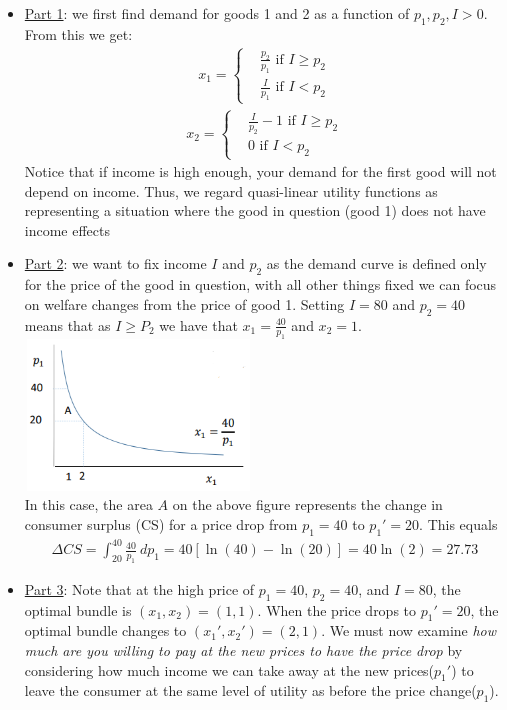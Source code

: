 \documentclass{article}
\begin{document}
  \begin{itemize}
    \item \underline{Part 1}: we first find demand for goods 1 and 2 as a function of $p_{1}, p_{2}, I > 0$. From this we get:
    \begin{gather*}
      x_{1} =
      \begin{cases}
         & \tfrac{p_{2}}{p_{1}} \text{ if } I \geq p_{2} \\
         & \tfrac{I}{p_{1}} \text{ if } I <  p_{2}
      \end{cases}
    \end{gather*}
    \begin{gather*}
      x_{2} =
      \begin{cases}
         & \tfrac{I}{p_{2}} - 1 \text{ if } I \geq p_{2} \\
         & 0 \text{ if } I < p_{2}
       \end{cases}
    \end{gather*}
    Notice that if income is high enough, your demand for the first good will not depend on income. Thus, we regard quasi-linear utility functions as representing a situation where the good in question (good 1) does not have income effects
    \item  \underline{Part 2}: we want to fix income $I$ and $p_{2}$ as the demand curve is defined only for the price of the good in question, with all other things fixed we can focus on welfare changes from the price of good 1. Setting $I = 80$ and $p_{2} = 40$ means that as $I \geq P_{2}$ we have that $x_{1} = \tfrac{40}{p_{1}}$ and $x_{2} = 1$.
    \\
    \includegraphics[width=6cm, height=4cm]{pic22}
    \\
    In this case, the area $A$ on the above figure represents the change in consumer surplus (CS) for a price drop from $p_{1} = 40$ to $p_{1}' = 20$. This equals
    \begin{gather*}
      \Delta CS = \int_{20}^{40} \frac{40}{p_{1}} \ dp_{1} = 40[\ln(40) - \ln(20)] = 40 \ln(2) = 27.73
    \end{gather*}
    \item  \underline{Part 3}: Note that at the high price of $p_{1} = 40$, $p_{2} = 40$, and $I = 80$, the optimal bundle is $(x_{1}, x_{2}) = (1, 1)$. When the price drops to $p_{1}' = 20$, the optimal bundle changes to $(x_{1}', x_{2}') = (2, 1)$. We must now examine \textit{how much are you willing to pay at the new prices to have the price drop} by considering how much income we can take away at the new prices($p_{1}'$) to leave the consumer at the same level of utility as before the price change($p_{1}$). \\

\end{itemize}
\end{document}
